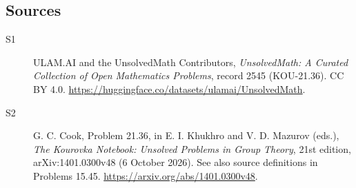 \documentclass[11pt]{article}
\begin{document}
\subsection{Sources}
\begin{description}
\item[\hypertarget{source:2545:1}{S1}] ULAM.AI and the UnsolvedMath Contributors, \emph{UnsolvedMath: A Curated Collection of Open Mathematics Problems}, record 2545 (KOU-21.36). CC BY 4.0. \url{https://huggingface.co/datasets/ulamai/UnsolvedMath}.
\item[\hypertarget{source:2545:2}{S2}] G. C. Cook, Problem 21.36, in E. I. Khukhro and V. D. Mazurov (eds.), \emph{The Kourovka Notebook: Unsolved Problems in Group Theory}, 21st edition, arXiv:1401.0300v48 (6 October 2026). See also source definitions in Problems 15.45. \url{https://arxiv.org/abs/1401.0300v48}.
\end{description}
\label{end:2545}
\end{document}
